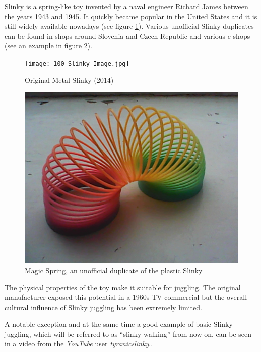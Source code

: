 
Slinky is a spring-like toy invented by a naval engineer Richard James
between the years 1943 and 1945.\cite{bellis:historyofslinky}
It quickly became popular in the United States and it is still
widely available nowadays (see figure \ref{fig:slinky-original}).
Various unofficial Slinky duplicates can be found in shops
around Slovenia and Czech Republic and various e-shops
(see an example in figure \ref{fig:slinky-magic}).

\begin{figure}
  \centering
  \texttt{[image: 100-Slinky-Image.jpg]}
  \caption{Original Metal Slinky (2014)\cite{poof:slinky}}
  \label{fig:slinky-original}
\end{figure}

\begin{figure}
  \centering
  \includegraphics[width=\linewidth]{slinky-magic.jpg}
  \caption{Magic Spring, an unofficial duplicate of the plastic Slinky}
  \label{fig:slinky-magic}
\end{figure}

The physical properties of the toy make it suitable for juggling.
The original manufacturer exposed this potential in
a 1960s TV commercial\cite{youtube:slinky_commercial}
but the overall cultural influence of Slinky juggling
has been extremely limited.

A notable exception
and at the same time a good example of basic Slinky juggling,
which will be referred to as ``slinky walking'' from now on,
can be seen in a video from the \emph{YouTube} user
\emph{tyranicslinky}.\cite{youtube:tyranicslinky}.

